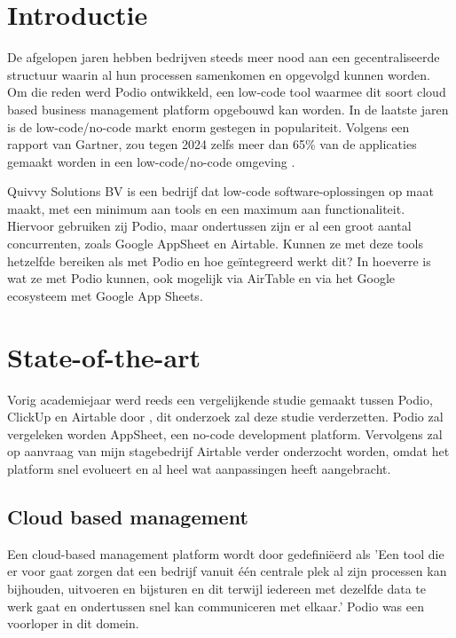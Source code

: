 
\section{Introductie}%
\label{sec:introductie}

De afgelopen jaren hebben bedrijven steeds meer nood aan een gecentraliseerde structuur waarin al hun processen samenkomen en opgevolgd kunnen worden. Om die reden werd Podio ontwikkeld, een low-code tool waarmee dit soort cloud based business management platform opgebouwd kan worden. In de laatste jaren is de low-code/no-code markt enorm gestegen in populariteit. Volgens een rapport van Gartner, zou tegen 2024 zelfs meer dan 65\% van de applicaties gemaakt worden in een low-code/no-code omgeving \autocite{Costello2021}.

Quivvy Solutions BV is een bedrijf dat low-code software-oplossingen op maat maakt, met een minimum aan tools en een maximum aan functionaliteit. Hiervoor gebruiken zij Podio, maar ondertussen zijn er al een groot aantal concurrenten, zoals Google AppSheet en Airtable. Kunnen ze met deze tools hetzelfde bereiken als met Podio en hoe geïntegreerd werkt dit? In hoeverre is wat ze met Podio kunnen, ook mogelijk via AirTable en via het Google ecosysteem met Google App Sheets.


\section{State-of-the-art}%
\label{sec:state-of-the-art}

 Vorig academiejaar werd reeds een vergelijkende studie gemaakt tussen Podio, ClickUp en Airtable door \textcite{Spitaels2022}, dit onderzoek zal deze studie verderzetten. Podio zal vergeleken worden  AppSheet, een no-code development platform. Vervolgens zal op aanvraag van mijn stagebedrijf Airtable verder onderzocht worden, omdat het platform snel evolueert en al heel wat aanpassingen heeft aangebracht.
 
\subsection{Cloud based management}

Een cloud-based management platform wordt door \textcite{Spitaels2022} gedefiniëerd als 'Een tool die er voor gaat zorgen dat een bedrijf vanuit één centrale plek al zijn processen kan bijhouden, uitvoeren en bijsturen en dit terwijl iedereen met dezelfde data te werk gaat en ondertussen snel kan communiceren met elkaar.'
Podio was een voorloper in dit domein.

